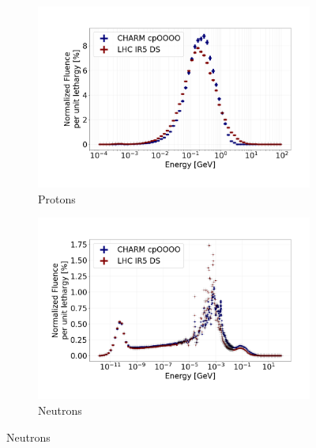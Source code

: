 \documentclass[encoding=utf8,british]{tumphthesis}
\begin{document}
\begin{figure}
    \centering 

\begin{subfigure}{0.49\textwidth}
  \includegraphics[width=\linewidth]{figures/proton_y_linear.png}
  \caption{Protons}
  \label{fig:BLM-spectrum-protons}
\end{subfigure}%
\begin{subfigure}{0.49\textwidth}
  \includegraphics[width=\linewidth]{figures/neutron_y_linear.png}
  \caption{Neutrons}
  \label{fig:BLM-spectrum-neutrons}
\end{subfigure}

\medskip


\end{figure}
\end{document}
